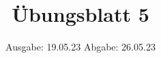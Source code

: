 

\title{Übungsblatt 5}
\date{%
  Ausgabe: 19.05.23 %
  \hspace{3em}
  Abgabe: 26.05.23 %
}



\maketitle
\thispagestyle{empty}
\tableofcontents
\newpage






